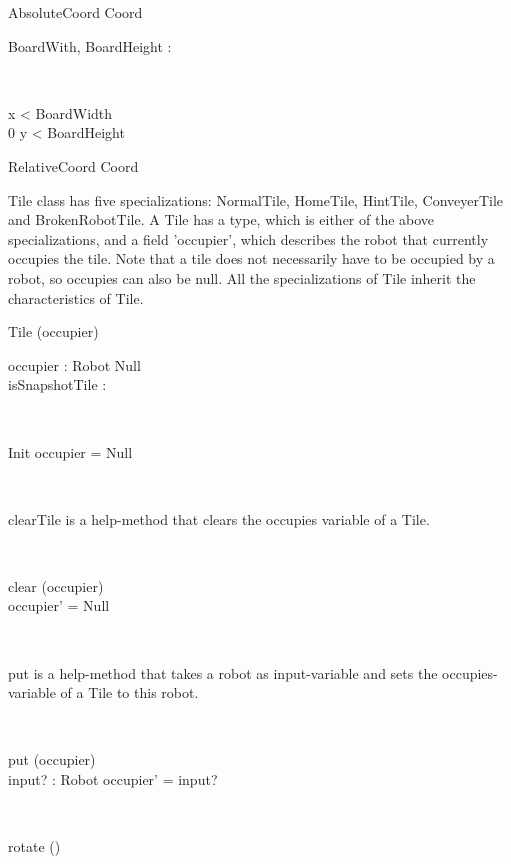 \begin{class}{AbsoluteCoord}
Coord \\
\begin{axdef}
BoardWith, BoardHeight : \nat
\end{axdef} \\
\begin{state}
 \leq x < BoardWidth \\
0 \leq y < BoardHeight
\end{state}
\end{class}

\begin{class}{RelativeCoord}
Coord \\
\end{class}

Tile class has five specializations: NormalTile, HomeTile, HintTile, ConveyerTile and BrokenRobotTile. A Tile has a type, which is either of the above specializations, and a field 'occupier', which describes the robot that currently occupies the tile. Note that a tile does not necessarily have to be occupied by a robot, so occupies can also be null. All the specializations of Tile inherit the characteristics of Tile.
\begin{class}{Tile}
\upharpoonright (occupier) \\
\begin{state}
occupier : Robot \cup Null \\
isSnapshotTile : \bool \\
\end{state} \\
\begin{schema}{Init}
occupier = Null
\end{schema} \\
\begin{classcom}
clearTile is a help-method that clears the occupies variable of a Tile.
\end{classcom} \\
\begin{schema}{clear}
\Delta (occupier) \\
\where
occupier' = Null
\end{schema} \\
\begin{classcom}
put is a help-method that takes a robot as input-variable and sets the occupies-variable of a Tile to this robot.
\end{classcom}\\
\begin{schema}{put}
\Delta (occupier) \\
input? : Robot
\where
occupier' = input?
\end{schema} \\
\begin{schema}{rotate}
\Delta()
\end{schema}
\end{class}

